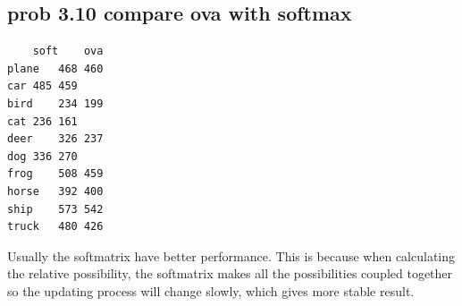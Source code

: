 \documentclass[pdftex,11pt]{article}
\begin{document}
\subsection{prob 3.10 compare ova with softmax}
\begin{lstlisting}   
	soft	ova
plane	468	460
car	485	459
bird	234	199
cat	236	161
deer	326	237
dog	336	270
frog	508	459
horse	392	400
ship	573	542
truck	480	426
\end{lstlisting}   

Usually the softmatrix have better performance. This is because when calculating the relative possibility, the softmatrix makes all the possibilities coupled together so the updating process will change slowly, which gives more stable result.
\end{document}
